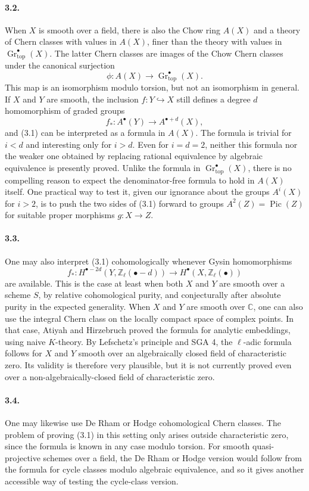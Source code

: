 \documentclass[12pt]{article}
\newcommand{\ZZ}{\mathbb Z}
\newcommand{\CC}{\mathbb C}
\newcommand{\Pic}{\operatorname{Pic}}
\newcommand{\Gr}{\operatorname{Gr}}
\newcommand{\longto}{\longrightarrow}
\newcommand{\topf}{\mathrm{top}}
\begin{document}
\paragraph{3.2.}
When $X$ is smooth over a field, there is also the Chow ring $A(X)$ and a theory of Chern classes with values in $A(X)$, finer than the theory with values in $\Gr^\bullet_{\topf}(X)$. The latter Chern classes are images of the Chow Chern classes under the canonical surjection
\[
\phi:A(X)\longto \Gr^\bullet_{\topf}(X).
\]
This map is an isomorphism modulo torsion, but not an isomorphism in general. If $X$ and $Y$ are smooth, the inclusion $f:Y\hookrightarrow X$ still defines a degree $d$ homomorphism of graded groups
\[
f_*:A^\bullet(Y)\longto A^{\bullet+d}(X),
\]
and (3.1) can be interpreted as a formula in $A(X)$. The formula is trivial for $i<d$ and interesting only for $i>d$. Even for $i=d=2$, neither this formula nor the weaker one obtained by replacing rational equivalence by algebraic equivalence is presently proved. Unlike the formula in $\Gr^\bullet_{\topf}(X)$, there is no compelling reason to expect the denominator-free formula to hold in $A(X)$ itself. One practical way to test it, given our ignorance about the groups $A^i(X)$ for $i>2$, is to push the two sides of (3.1) forward to groups $A^2(Z)=\Pic(Z)$ for suitable proper morphisms $g:X\to Z$.

\paragraph{3.3.}
One may also interpret (3.1) cohomologically whenever Gysin homomorphisms
\[
f_*:H^{\bullet-2d}(Y,\ZZ_\ell(\bullet-d))
   \longto H^\bullet(X,\ZZ_\ell(\bullet))
\]
are available. This is the case at least when both $X$ and $Y$ are smooth over a scheme $S$, by relative cohomological purity, and conjecturally after absolute purity in the expected generality. When $X$ and $Y$ are smooth over $\CC$, one can also use the integral Chern class on the locally compact space of complex points. In that case, Atiyah and Hirzebruch proved the formula for analytic embeddings, using naive $K$-theory. By Lefschetz's principle and SGA 4, the $\ell$-adic formula follows for $X$ and $Y$ smooth over an algebraically closed field of characteristic zero. Its validity is therefore very plausible, but it is not currently proved even over a non-algebraically-closed field of characteristic zero.

\paragraph{3.4.}
One may likewise use De Rham or Hodge cohomological Chern classes. The problem of proving (3.1) in this setting only arises outside characteristic zero, since the formula is known in any case modulo torsion. For smooth quasi-projective schemes over a field, the De Rham or Hodge version would follow from the formula for cycle classes modulo algebraic equivalence, and so it gives another accessible way of testing the cycle-class version.
\end{document}
